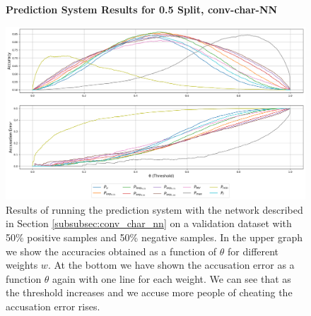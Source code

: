 \begin{figure}
    \centering
    \textbf{Prediction System Results for 0.5 Split, \glsdesc{conv-char-NN}}\par\medskip
    \includegraphics[scale=0.33]{./pictures/experiments/conv_char_nn/prediction_system_50.png}
    \caption{Results of running the prediction system with the network described
        in Section \ref{subsubsec:conv_char_nn} on a validation dataset with
        50\% positive samples and 50\% negative samples. In the upper graph we
        show the accuracies obtained as a function of $\theta$ for different
        weights $w$. At the bottom we have shown the accusation error as a
        function $\theta$ again with one line for each weight. We can see that
        as the threshold increases and we accuse more people of cheating the
        accusation error rises.}
    \label{fig:conv-char-NN-pred-50}
\end{figure}

